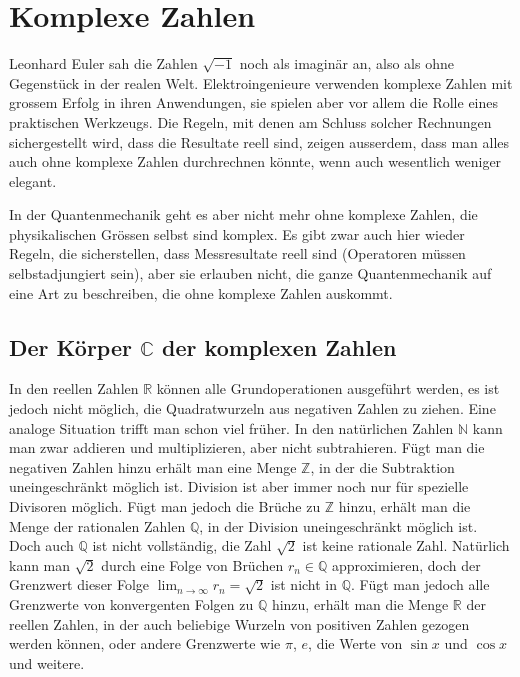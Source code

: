 %
%
\chapter{Komplexe Zahlen\label{appendix:komplexezahlen}}
\rhead{}
Leonhard Euler sah die Zahlen $\sqrt{-1}$ noch als imaginär an,
also als ohne Gegenstück in der realen Welt.
Elektroingenieure verwenden komplexe Zahlen mit grossem Erfolg in ihren
Anwendungen, sie spielen aber vor allem die Rolle eines praktischen
Werkzeugs. Die Regeln, mit denen am Schluss solcher Rechnungen sichergestellt
wird, dass die Resultate reell sind, zeigen ausserdem, dass man alles auch
ohne komplexe Zahlen durchrechnen könnte, wenn auch wesentlich weniger
elegant.

In der Quantenmechanik geht es aber nicht mehr ohne komplexe Zahlen,
die physikalischen Grössen selbst sind komplex. Es gibt zwar auch
hier wieder Regeln, die sicherstellen, dass Messresultate reell sind
(Operatoren müssen selbstadjungiert sein), aber sie erlauben nicht,
die ganze Quantenmechanik auf eine Art zu beschreiben, die ohne komplexe
Zahlen auskommt.

\section{Der Körper \texorpdfstring{$\mathbb C$}{C} der komplexen Zahlen}
In den reellen Zahlen $\mathbb R$ können alle Grundoperationen ausgeführt
werden, es ist jedoch nicht möglich, die Quadratwurzeln aus negativen
Zahlen zu ziehen. Eine analoge Situation trifft man schon viel früher.
In den natürlichen Zahlen $\mathbb N$ kann man zwar addieren und
multiplizieren, aber nicht subtrahieren.
Fügt man die negativen Zahlen hinzu erhält man eine Menge $\mathbb Z$,
in der die Subtraktion uneingeschränkt möglich ist. Division ist aber
immer noch nur für spezielle Divisoren möglich. Fügt man jedoch die
Brüche zu $\mathbb Z$ hinzu, erhält man die Menge der rationalen Zahlen
$\mathbb Q$, in der Division uneingeschränkt möglich ist.
Doch auch $\mathbb Q$ ist nicht vollständig, die Zahl $\sqrt{2}$ ist
keine rationale Zahl. Natürlich kann man $\sqrt{2}$ durch eine
Folge von Brüchen $r_n\in\mathbb Q$ approximieren, doch der Grenzwert
dieser Folge $\lim_{n\to\infty}r_n=\sqrt{2}$ ist nicht in $\mathbb Q$.
Fügt man jedoch alle Grenzwerte von konvergenten Folgen zu $\mathbb Q$
hinzu, erhält man die Menge $\mathbb R$ der reellen Zahlen, in der
auch beliebige Wurzeln von positiven Zahlen gezogen werden können,
oder andere Grenzwerte wie $\pi$, $e$, die Werte von $\sin x$ und $\cos x$
und weitere.

